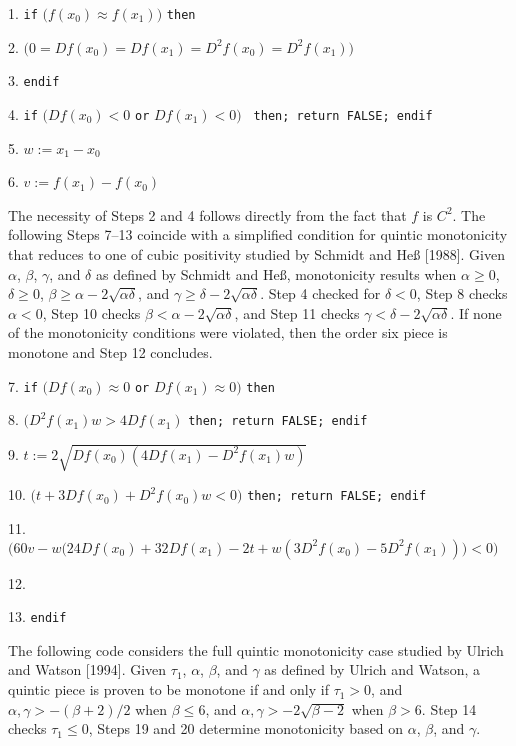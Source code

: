{\parindent=6mm
\item{1.} {\tt if} $\bigl(f(x_0) \approx f(x_1)\bigr)$ {\tt then}
\item{2.}  $\bigl( 0 = Df(x_0) = Df(x_1)
  = D^2f(x_0) = D^2f(x_1) \bigr)$
\item{3.} {\tt endif}
\item{4.} {\tt if} $\bigl(Df(x_0) < 0$ {\tt or} $Df(x_1) < 0\bigr)$ {\tt
  then; return FALSE; endif}
\item{5.} $w := x_1 - x_0$
\item{6.} $v := f(x_1) - f(x_0)$

\item{} {The necessity of Steps 2 and 4 follows directly from
  the fact that $f$ is $C^2$. The following Steps 7--13 coincide with
  a simplified condition for quintic monotonicity that reduces to one
  of cubic positivity studied by Schmidt and He{\ss} [1988]. Given
  $\alpha$, $\beta$, $\gamma$, and $\delta$ as defined by Schmidt and
  He{\ss}, monotonicity results when $\alpha \geq 0$, $\delta \geq 0$,
  $\beta \geq \alpha - 2 \sqrt{\alpha \delta}$, and $\gamma \geq
  \delta - 2 \sqrt{\alpha \delta}$.  Step 4 checked for $\delta < 0$,
  Step 8 checks $\alpha < 0$, Step 10 checks $\beta < \alpha - 2
  \sqrt{\alpha \delta}$, and Step 11 checks $\gamma < \delta - 2
  \sqrt{\alpha \delta}$. If none of the monotonicity conditions were
  violated, then the order six piece is monotone and Step 12
  concludes.}

\item{7.} {\tt if} $\bigl(Df(x_0) \approx 0$ {\tt or} $Df(x_1) \approx
0\bigr)$ {\tt then}
\item{8.}  $\bigl(D^2f(x_1)w > 4Df(x_1)$ {\tt then;
return FALSE; endif}
\item{9.} \codent $t := 2 \sqrt{Df(x_0) (4Df(x_1) - D^2f(x_1) w) }$
\item{10.}  $\bigl(t + 3Df(x_0) + D^2f(x_0)w < 0 \bigr)$
  {\tt then; return FALSE; endif}
\item{11.}  $\bigl(60v - w\bigl(24Df(x_0) + 32Df(x_1) - 2t
  + w(3D^2f(x_0) - 5D^2f(x_1))\bigr) < 0\bigr)$
\item{}   \codent {}
\item{12.} 
\item{13.} {\tt endif}

\item{} {The following code considers the full quintic monotonicity
case studied by Ulrich and Watson [1994]. Given $\tau_1$, $\alpha$,
$\beta$, and $\gamma$ as defined by Ulrich and Watson, a quintic
piece is proven to be monotone if and only if
$\tau_1 > 0$, and $\alpha, \gamma > -(\beta+2)/2$ when $\beta \leq 6$,
and $\alpha, \gamma > -2 \sqrt{\beta-2}$ when $\beta > 6$.
Step 14 checks $\tau_1 \le 0$, Steps 19 and 20 determine monotonicity based
on $\alpha$, $\beta$, and $\gamma$.}

}
